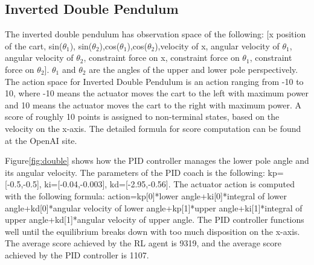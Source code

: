 \documentclass[smallextended]{svjour3}
\begin{document}
\subsection{Inverted Double Pendulum}
The inverted double pendulum has observation space of the following: [x position of the cart, sin($\theta_1$), sin($\theta_2$),cos($\theta_1$),cos($\theta_2$),velocity of x, angular velocity of $\theta_1$, angular velocity of $\theta_2$, constraint force on x, constraint force on $\theta_1$, constraint force on $\theta_2$]. $\theta_1$ and $\theta_2$ are the angles of the upper and lower pole perspectively. The action space for Inverted Double Pendulum is an action ranging from -10 to 10, where -10 means the actuator moves the cart to the left with maximum power and 10 means the actuator moves the cart to the right with maximum power. A score of roughly 10 points is assigned to non-terminal states, based on the velocity on the x-axis. The detailed formula for score computation can be found at the OpenAI site.

Figure\ref{fig:double} shows how the PID controller manages the lower pole angle and its angular velocity. The parameters of the PID coach is the following: kp=[-0.5,-0.5], ki=[-0.04,-0.003], kd=[-2.95,-0.56]. The actuator action is computed with the following formula: action=kp[0]*lower angle+ki[0]*integral of lower angle+kd[0]*angular velocity of lower angle+kp[1]*upper angle+ki[1]*integral of upper angle+kd[1]*angular velocity of upper angle. The PID controller functions well until the equilibrium breaks down with too much disposition on the x-axis. The average score achieved by the RL agent is 9319, and the average score achieved by the PID controller is 1107.
\end{document}
